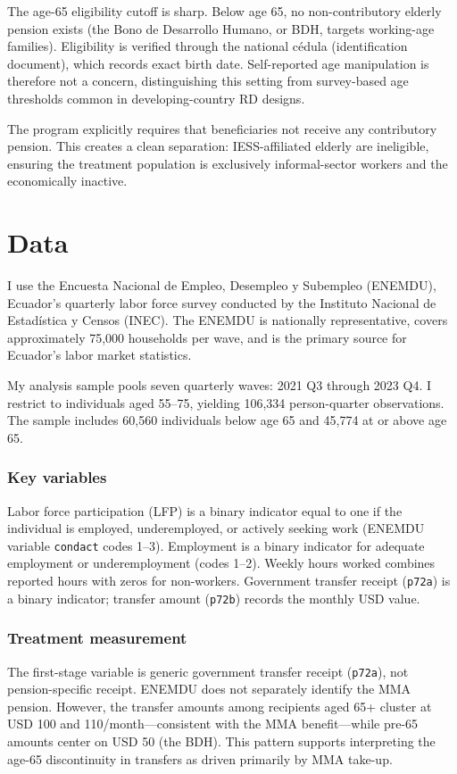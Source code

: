 \documentclass[12pt]{article}
\begin{document}
The age-65 eligibility cutoff is sharp. Below age 65, no non-contributory elderly pension exists (the Bono de Desarrollo Humano, or BDH, targets working-age families). Eligibility is verified through the national c\'{e}dula (identification document), which records exact birth date. Self-reported age manipulation is therefore not a concern, distinguishing this setting from survey-based age thresholds common in developing-country RD designs.

The program explicitly requires that beneficiaries not receive any contributory pension. This creates a clean separation: IESS-affiliated elderly are ineligible, ensuring the treatment population is exclusively informal-sector workers and the economically inactive.


\section{Data}
\label{sec:data}

I use the Encuesta Nacional de Empleo, Desempleo y Subempleo (ENEMDU), Ecuador's quarterly labor force survey conducted by the Instituto Nacional de Estad\'{i}stica y Censos (INEC). The ENEMDU is nationally representative, covers approximately 75,000 households per wave, and is the primary source for Ecuador's labor market statistics.

My analysis sample pools seven quarterly waves: 2021 Q3 through 2023 Q4. I restrict to individuals aged 55--75, yielding 106,334 person-quarter observations. The sample includes 60,560 individuals below age 65 and 45,774 at or above age 65.

\subsubsection*{Key variables} Labor force participation (LFP) is a binary indicator equal to one if the individual is employed, underemployed, or actively seeking work (ENEMDU variable \texttt{condact} codes 1--3). Employment is a binary indicator for adequate employment or underemployment (codes 1--2). Weekly hours worked combines reported hours with zeros for non-workers. Government transfer receipt (\texttt{p72a}) is a binary indicator; transfer amount (\texttt{p72b}) records the monthly USD value.

\subsubsection*{Treatment measurement} The first-stage variable is generic government transfer receipt (\texttt{p72a}), not pension-specific receipt. ENEMDU does not separately identify the MMA pension. However, the transfer amounts among recipients aged 65+ cluster at USD 100 and 110/month---consistent with the MMA benefit---while pre-65 amounts center on USD 50 (the BDH). This pattern supports interpreting the age-65 discontinuity in transfers as driven primarily by MMA take-up.
\end{document}
